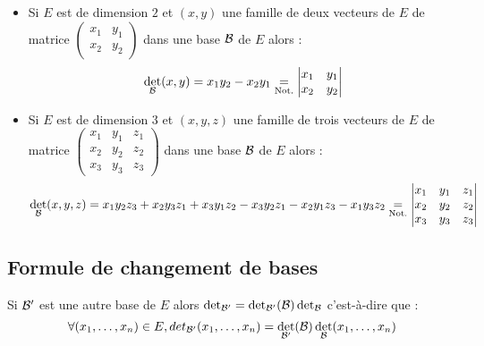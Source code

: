 \begin{defprop}
    \begin{itemize}
        \item Si \(E\) est de dimension \(2\) et \((x, y)\) une famille de deux vecteurs de \(E\) de matrice \(\begin{pmatrix}
              x_{1} & y_{1} \\
              x_{2} & y_{2}
              \end{pmatrix}\) dans une base \(\cal{B}\) de \(E\) alors :
            \[\det_{\cal{B}}(x, y) = x_1y_2 - x_2y_1 \underset{\text{Not.}}{=}\begin{vmatrix}
              x_{1} & y_{1} \\
              x_{2} & y_{2}
              \end{vmatrix}\]
        \item Si \(E\) est de dimension \(3\) et \((x, y, z)\) une famille de trois vecteurs de \(E\) de matrice \(\begin{pmatrix}
              x_{1} & y_{1} & z_{1} \\
              x_{2} & y_{2} & z_{2} \\
              x_{3} & y_{3} & z_{3}
              \end{pmatrix}\) dans une base \(\cal{B}\) de \(E\) alors :
            \[\det_{\cal{B}}(x, y, z) = x_1 y_2 z_3 + x_2 y_3 z_1 + x_3 y_1 z_2 - x_3 y_2 z_1 - x_2 y_1 z_3 - x_1 y_3 z_2 \underset{\text{Not.}}{=} \begin{vmatrix}
              x_{1} & y_{1} & z_{1} \\
              x_{2} & y_{2} & z_{2} \\
              x_{3} & y_{3} & z_{3}
              \end{vmatrix}\]
    \end{itemize}
\end{defprop}
\subsection{Formule de changement de bases}
\begin{defprop}
    Si \(\cal{B}'\) est une autre base de \(E\) alors \(\det_{\cal{B}'} = \det_{\cal{B}'}(\cal{B}) \det_{\cal{B}}\) c’est-à-dire que :
    \[\forall  (x_1, \dots  , x_n) \in  E, det_{\cal{B}'} (x_1, \dots  , x_n) = \det_{\cal{B}'}(\cal{B}) \det_{\cal{B}} (x_1, \dots  , x_n) \]
\end{defprop}
